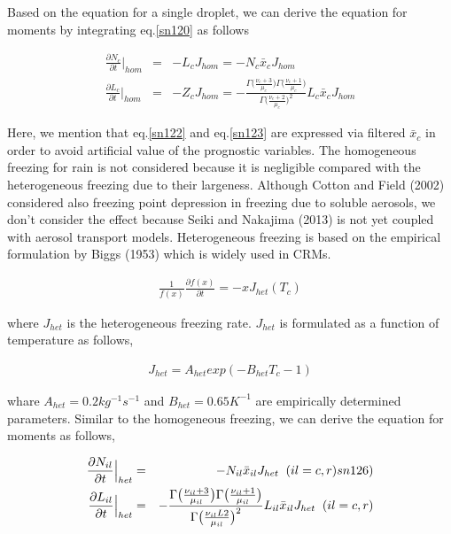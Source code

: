 Based on the equation for a single droplet, we can derive the equation for moments by integrating eq.\ref{sn120} as follows

\begin{eqnarray}
\frac{\partial N_{c}}{\partial t}\Bigr|_{hom}&=&-L_{c}J_{hom}=-N_{c}\bar{x}_{c}J_{hom}\label{sn122}\\
\frac{\partial L_{c}}{\partial t}\Bigr|_{hom}&=&-Z_{c}J_{hom}=-\frac{\Gamma\bigl(\frac{\nu_{c}+3}{\mu_{c}}\bigr)\Gamma\bigl(\frac{\nu_{c}+1}{\mu_{c}}\bigr)}{\Gamma\bigl(\frac{\nu_{c}+2}{\mu_{c}}\bigr)^{2}}L_{c}\bar{x}_{c}J_{hom}\label{sn123}
\end{eqnarray}

Here, we mention that eq.\ref{sn122} and eq.\ref{sn123} are expressed via filtered $\bar{x}_{c}$ in order to avoid artificial value of the prognostic variables. The homogeneous freezing for rain is not considered because it is negligible compared with the heterogeneous freezing due to their largeness. Although Cotton and Field (2002) considered also freezing point depression in freezing due to soluble aerosols, we don’t consider the effect because Seiki and Nakajima (2013) is not yet coupled with aerosol transport models.
Heterogeneous freezing is based on the empirical formulation by Biggs (1953) which is widely used in CRMs.

\begin{eqnarray}
\frac{1}{f(x)}\frac{\partial f(x)}{\partial t}=-xJ_{het}(T_{c})\label{sn124}
\end{eqnarray}

where $J_{het}$ is the heterogeneous freezing rate. $J_{het}$ is formulated as a function of temperature as follows,

\begin{eqnarray}
J_{het}=A_{het}exp(-B_{het}T_{c}-1)\label{sn125}
\end{eqnarray}

whare $A_{het}=0.2kg^{-1}s^{-1}$ and $B_{het}=0.65K^{-1}$ are empirically determined parameters. Similar to the homogeneous freezing, we can derive the equation for moments as follows,

\begin{eqnarray}
\frac{\partial N_{il}}{\partial t}\Bigr|_{het}&=&-N_{il}\bar{x}_{il}J_{het}\;\;(il=c,r)\label(sn126)\\
\frac{\partial L_{il}}{\partial t}\Bigr|_{het}&=&-\frac{\Gamma\bigl(\frac{\nu_{il}+3}{\mu_{il}}\bigr)\Gamma\bigl(\frac{\nu_{il}+1}{\mu_{il}}\bigr)}{\Gamma\bigl(\frac{\nu_{il}L2}{\mu_{il}}\bigr)^{2}}L_{il}\bar{x}_{il}J_{het}\;\;(il=c,r)\label{sn127}
\end{eqnarray}

